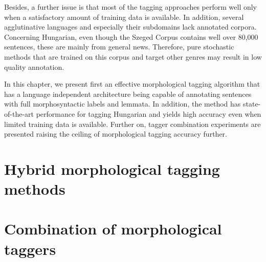 Besides, a further issue is that most of the tagging approaches perform well only when a satisfactory amount of training data is available. 
In addition, several agglutinative languages and especially their subdomains lack annotated corpora. 
Concerning Hungarian, even though the Szeged Corpus contains well over 80,000 sentences, these are mainly from general news. 
Therefore, pure stochastic methods that are trained on this corpus and target other genres may result in low quality annotation. 

In this chapter, we present first an effective morphological tagging algorithm that has a language independent architecture being capable of annotating sentences with full morphosyntactic labels and lemmata. 
In addition, the method has state-of-the-art performance for tagging Hungarian and yields high accuracy even when limited training data is available. 
Further on, tagger combination experiments are presented raising the ceiling of morphological tagging accuracy further. 

\section{Hybrid morphological tagging methods}\label{sec:tagging}



\section{Combination of morphological taggers}\label{sec:combination}


 
